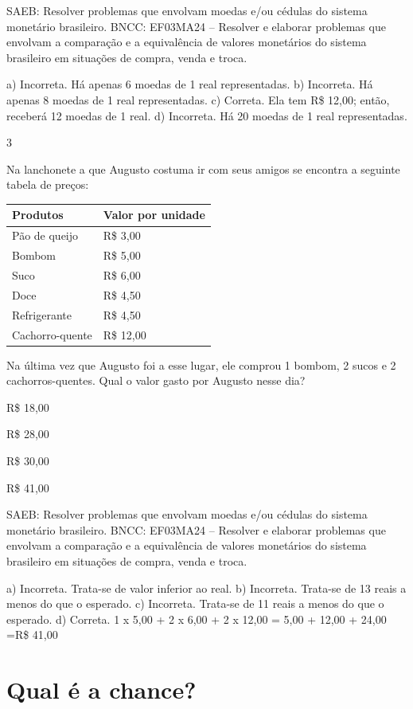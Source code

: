 \begin{multicols}{2}
{\begin{escolha}
SAEB: Resolver problemas que envolvam moedas e/ou cédulas do sistema monetário brasileiro. 
BNCC: EF03MA24 -- Resolver e elaborar problemas que envolvam a comparação e a equivalência de
valores monetários do sistema brasileiro em situações de compra, venda e troca.

a) Incorreta. Há apenas 6 moedas de 1 real representadas.
b) Incorreta. Há apenas 8 moedas de 1 real representadas.
c) Correta. Ela tem R\$ 12,00; então, receberá 12 moedas de 1 real.
d) Incorreta. Há 20 moedas de 1 real representadas.

\num{3}

Na lanchonete a que Augusto costuma ir com seus amigos se encontra a
seguinte tabela de preços:

\begin{longtable}[]{@{}ll@{}}
\toprule
Produtos & Valor por unidade\tabularnewline
\midrule
\endhead
Pão de queijo & R\$ 3,00\tabularnewline
Bombom & R\$ 5,00\tabularnewline
Suco & R\$ 6,00\tabularnewline
Doce & R\$ 4,50\tabularnewline
Refrigerante & R\$ 4,50\tabularnewline
Cachorro-quente & R\$ 12,00\tabularnewline
\bottomrule
\end{longtable}

Na última vez que Augusto foi a esse lugar, ele comprou 1 bombom, 2
sucos e 2 cachorros-quentes. Qual o valor gasto por Augusto nesse dia?

\begin{escolha}

\item
  R\$ 18,00
\item
  R\$ 28,00
\item
  R\$ 30,00
\item
  R\$ 41,00
\end{escolha}

SAEB: Resolver problemas que envolvam moedas e/ou cédulas do sistema monetário brasileiro. 
BNCC: EF03MA24 -- Resolver e elaborar problemas que envolvam a comparação e a equivalência de
valores monetários do sistema brasileiro em situações de compra, venda e troca.

a) Incorreta. Trata-se de valor inferior ao real.
b) Incorreta. Trata-se de 13 reais a menos do que o esperado.
c) Incorreta. Trata-se de 11 reais a menos do que o esperado.
d) Correta.
1 x 5,00 + 2 x 6,00 + 2 x 12,00 = 5,00 + 12,00 + 24,00 =R\$ 41,00


\chapter{Qual é a chance?}


\end{escolha}}
\end{multicols}
